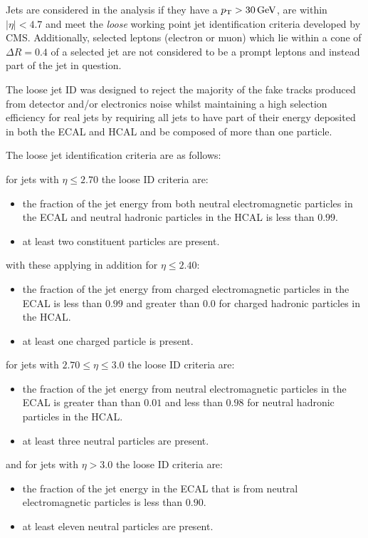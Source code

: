 Jets are considered in the analysis if they have a $p_{\mathrm{T}} > 30\,\text{Ge\hspace{-.08em}V}$, are within $|\eta| < 4.7$ and meet the \emph{loose} working point jet identification criteria developed by CMS.
Additionally, selected leptons (electron or muon) which lie within a cone of $\Delta R = 0.4$ of a selected jet are not considered to be a prompt leptons and instead part of the jet in question.

The loose jet ID was designed to reject the majority of the fake tracks produced from detector and/or electronics noise whilst maintaining a high selection efficiency for real jets by requiring all jets to have part of their energy deposited in both the ECAL and HCAL and be composed of more than one particle.

The loose jet identification criteria are as follows:

for jets with $\eta \leq 2.70$ the loose ID criteria are:
\begin{itemize}
\item the fraction of the jet energy from both neutral electromagnetic particles in the ECAL and neutral hadronic particles in the HCAL is less than $0.99$.
\item at least two constituent particles are present.
\end{itemize}

with these applying in addition for $\eta \leq 2.40$:
\begin{itemize}
\item the fraction of the jet energy from charged electromagnetic particles in the ECAL is less than $0.99$ and greater than 0.0 for charged hadronic particles in the HCAL.
\item at least one charged particle is present.
\end{itemize}


for jets with $ 2.70 \leq \eta \leq 3.0$ the loose ID criteria are:
\begin{itemize}
\item the fraction of the jet energy from neutral electromagnetic particles in the ECAL is greater than than $0.01$ and less than $0.98$ for neutral hadronic particles in the HCAL.
\item at least three neutral particles are present.
\end{itemize}

and for jets with $\eta > 3.0$ the loose ID criteria are:
\begin{itemize}
\item the fraction of the jet energy in the ECAL that is from neutral electromagnetic particles is less than $0.90$.
\item at least eleven neutral particles are present.
\end{itemize}

